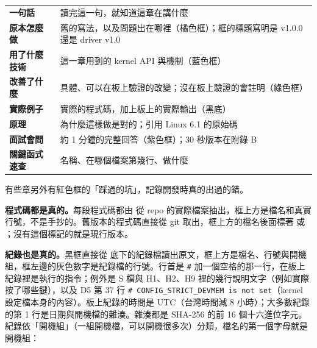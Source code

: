 \begin{center}
\small
\begin{tabularx}{0.95\textwidth}{>{\bfseries}l X}
\toprule
一句話 & 讀完這一句，就知道這章在講什麼 \\
原本怎麼做 & 舊的寫法，以及問題出在哪裡（\colorbox{oldbg}{橘色框}）；框的標題寫明是 v1.0.0 還是 driver v1.0 \\
用了什麼技術 & 這一章用到的 kernel API 與機制（\colorbox{techbg}{藍色框}） \\
改善了什麼 & 具體、可以在板上驗證的改變；沒在板上驗證的會註明（\colorbox{gainbg}{綠色框}） \\
實際例子 & 實際的程式碼，加上板上的實際輸出（黑底） \\
原理 & 為什麼這樣做是對的；引用 Linux 6.1 的原始碼 \\
面試會問 & 約 1 分鐘的完整回答（\colorbox{qabg}{紫色框}）；30 秒版本在附錄 B \\
關鍵函式速查 & 名稱、在哪個檔案第幾行、做什麼 \\
\bottomrule
\end{tabularx}
\end{center}

有些章另外有\colorbox{pitbg}{紅色框}的「踩過的坑」，記錄開發時真的出過的錯。

\textbf{程式碼都是真的。}每段程式碼都由  從 repo 的實際檔案抽出，框上方是檔名和真實行號，不是手抄的。舊版本的程式碼直接從 git 取出，框上方的檔名後面標著  或 ；沒有這個標記的就是現行版本。

\textbf{紀錄也是真的。}黑框直接從  底下的紀錄檔讀出原文，框上方是檔名、行號與開機組，框左邊的灰色數字是紀錄檔的行號。行首是 \texttt{\#} 加一個空格的那一行，在板上紀錄裡是執行的指令；例外是 S 檔與 H1、H2、H9 裡的幾行說明文字（例如實際按了哪些鍵），以及 D5 第 37 行 \texttt{\# CONFIG\_STRICT\_DEVMEM is not set}（kernel 設定檔本身的內容）。板上紀錄的時間是 UTC（台灣時間減 8 小時）；大多數紀錄的第 1 行是日期與開機檔的雜湊。雜湊都是 SHA-256 的前 16 個十六進位字元。紀錄依「開機組」（一組開機檔，可以開機很多次）分類，檔名的第一個字母就是開機組：

